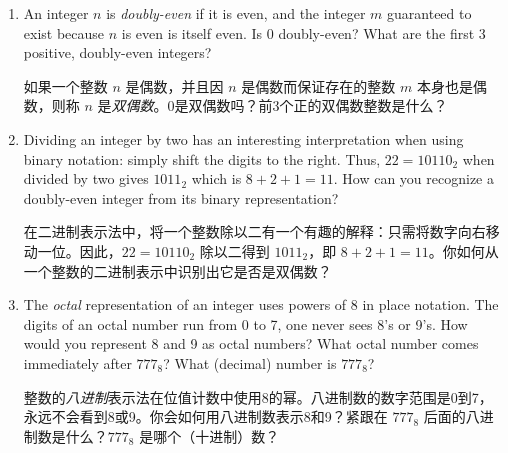 \begin{enumerate}

  \item An integer $n$ is  \emph{doubly-even} 
  if it is even, and the integer $m$ guaranteed to exist because 
  $n$ is even is itself even.
  Is 0 doubly-even?  What are the 
  first 3 positive, doubly-even integers?
  
  如果一个整数 $n$ 是偶数，并且因 $n$ 是偶数而保证存在的整数 $m$ 本身也是偶数，则称 $n$ 是\emph{双偶数}。0是双偶数吗？前3个正的双偶数整数是什么？
  \wbvfill
  
  
  \item Dividing an integer by two has an interesting interpretation
  when using binary notation: simply shift the digits to the right.
  Thus, $22 = 10110_2$ when divided by two gives $1011_2$ which is
  $8+2+1=11$.
  How can you recognize a doubly-even integer from
  its binary representation?
  
  在二进制表示法中，将一个整数除以二有一个有趣的解释：只需将数字向右移动一位。因此，$22 = 10110_2$ 除以二得到 $1011_2$，即 $8+2+1=11$。你如何从一个整数的二进制表示中识别出它是否是双偶数？
  
  \wbvfill
  
  
  \item The  \emph{octal} representation 
  of an integer uses powers of 8 in place notation.
  The digits of an 
  octal number run from 0 to 7, one never sees 8's or 9's.
  How would 
  you represent 8 and 9 as octal numbers?  What octal number comes 
  immediately after $777_8$?
  What (decimal) number is $777_8$?
  
  整数的\emph{八进制}表示法在位值计数中使用8的幂。八进制数的数字范围是0到7，永远不会看到8或9。你会如何用八进制数表示8和9？紧跟在 $777_8$ 后面的八进制数是什么？$777_8$ 是哪个（十进制）数？
  
  \wbvfill
  
  \workbookpagebreak
  
\end{enumerate}
